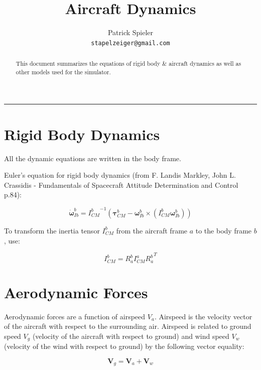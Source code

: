 \documentclass[a4paper]{paper}
\author{
Patrick Spieler \\
\texttt{stapelzeiger@gmail.com}
}
\title{Aircraft Dynamics}
\begin{document}
\maketitle
\hrule
\bigskip


\begin{abstract}

This document summarizes the equations of rigid body \& aircraft dynamics as well as other models used for the simulator.

\end{abstract}

\tableofcontents

\pagebreak

\section{Rigid Body Dynamics}

All the dynamic equations are written in the body frame.

Euler's equation for rigid body dynamics (from F. Landis Markley, John L. Crassidis - Fundamentals of Spacecraft Attitude Determination and Control p.84):

\begin{equation}
    \dot{\bm\omega}_{Ib}^b = {I^b_{CM}}^{-1} \left(\bm\tau^b_{CM} - \bm\omega_{Ib}^b \times (I^b_{CM} \bm\omega_{Ib}^b)\right)
\end{equation}

To transform the inertia tensor $I^b_{CM}$ from the aircraft frame $a$ to the body frame $b$, use:

\begin{equation}
    I^b_{CM} = R_a^b I^a_{CM} {R_a^b}^T
\end{equation}

\section{Aerodynamic Forces}

Aerodynamic forces are a function of airspeed $V_a$. Airspeed is the velocity vector of the aircraft with respect to the surrounding air. Airspeed is related to ground speed $V_g$ (velocity of the aircraft with respect to ground) and wind speed $V_w$ (velocity of the wind with respect to ground) by the following vector equality:

\begin{equation}
    \bm{V}_g = \bm{V}_a + \bm{V}_w
\end{equation}
\end{document}
